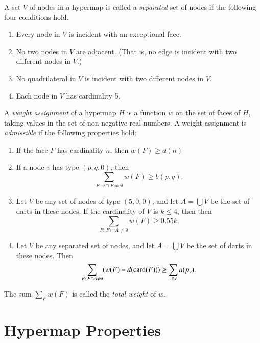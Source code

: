 \begin{definition}
A set $V$ of nodes in a hypermap is called a {\it separated\/} set
of nodes if the following four conditions hold.
%
    \begin{enumerate}
      \item Every node in $V$ is incident with an exceptional face.
      \item No two
        nodes in $V$ are adjacent.  (That is, no edge is incident
        with two different nodes in $V$.)
      \item No quadrilateral in $V$ is incident with two different nodes
        in $V$.
      \item Each node in $V$ has cardinality 5.
    \end{enumerate}
\end{definition}

\begin{definition}
%
A {\it weight assignment\/} of a hypermap $H$ is a function $w$ on
the set of faces of $H$, taking values in the set of non-negative
real numbers. A weight assignment is {\it admissible} if the
following properties hold:
%
\begin{enumerate}
  \item If the face $F$ has cardinality $n$, then
        $w(F) \ge d(n)$
  \item If a node $v$ has type $(p,q,0)$, then
        $$\sum_{F:\,v\cap F\ne\emptyset} w(F) \ge b(p,q).$$
        \label{admissible:b}
  \item Let $V$ be any set of nodes of type $(5,0,0)$, and let $A =\bigcup V$ be
        the set of darts in these nodes.
        If the cardinality of $V$ is $k\le 4$, then
        then
        $$\sum_{F:\,F\cap A\ne\emptyset} w(F) \ge 0.55 k.$$
  \item Let $V$ be any separated set of nodes, and let $A =\bigcup V$ be
        the set of darts in these nodes.
        Then
        $$\sum_{F:\,F\cap A\ne\emptyset} (w(F) -d({\operatorname{card}}(F)))
            \ge \sum_{v\in V} a(p_v).$$
        \label{definition:admissible:excess}
\end{enumerate}
The sum $\sum_F w(F)$ is called the {\it total weight} of $w$.
\end{definition}





\section{Hypermap Properties}
\label{sec:graphproperty}


